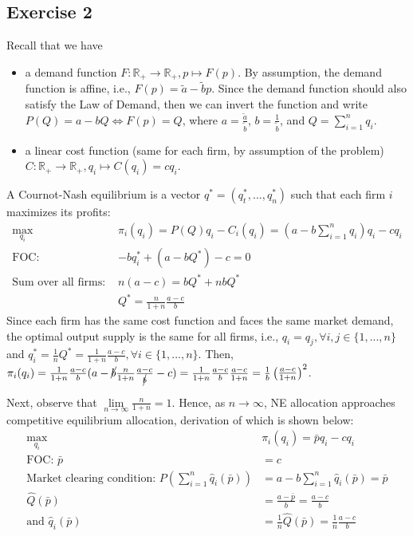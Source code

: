 \documentclass[]{article}
\begin{document}
\subsection*{Exercise 2}

Recall that we have 
\begin{itemize}
	\item a demand function $F: \mathbb{R}_{+}\to\mathbb{R}_{+}, p\mapsto F(p)$. By assumption, the demand function is affine, i.e., $F(p) = \tilde{a} - \tilde{b}p$. Since the demand function should also satisfy the Law of Demand, then we can invert the function and write $P(Q) = a - bQ \Leftrightarrow F(p) = Q$, where $a = \frac{\tilde{a}}{\tilde{b}}$, $b = \frac{1}{\tilde{b}}$, and $Q = \sum\limits_{i = 1}^nq_i$.
	\item a linear cost function (same for each firm, by assumption of the problem) $C:\mathbb{R}_{+}\to\mathbb{R}_{+}, q_i\mapsto C(q_i) = cq_i$. 
\end{itemize}

A Cournot-Nash equilibrium is a vector $q^* = (q_t^*, ..., q_n^*)$ such that each firm $i$ maximizes its profits:
\begin{equation}
	\begin{split}
		\max\limits_{q_i}\quad&\pi_i(q_i) = P(Q)q_i - C_i(q_i) = (a - b\sum\limits_{i = 1}^n q_i)q_i -  cq_i \\\nonumber
		\text{FOC: }&-bq_i^* + (a - bQ^*) - c = 0\\
		\text{Sum over all firms: }&n(a - c) = bQ^* + nbQ^* \\
		&Q^* = \frac{n}{1 + n}\frac{a - c}{b}
	\end{split}
\end{equation}
Since each firm has the same cost function and faces the same market demand, the optimal output supply is the same for all firms, i.e., $q_i = q_j, \forall i, j\in \{1, ..., n\}$ and $q_i^* = \frac{1}{n}Q^* = \frac{1}{1 + n}\frac{a - c}{b}, \forall i\in\{1, ..., n\}$. Then, $\pi_i(q_i) = \frac{1}{1 + n}\frac{a - c}{b}(a - \cancel{b}\frac{n}{1 + n}\frac{a - c}{\cancel{b}} - c) = \frac{1}{1 + n}\frac{a - c}{b}\frac{a - c}{1 + n} = \frac{1}{b}\begin{pmatrix}\frac{a - c}{1 + n}\end{pmatrix}^2$.

Next, observe that $\lim\limits_{n\to\infty} \frac{n}{1 + n} = 1$. Hence, as $n\to\infty$, NE allocation approaches competitive equilibrium allocation, derivation of which is shown below:
\begin{equation}
\begin{split}
\max\limits_{q_i}\quad&\pi_i(q_i) = \bar{p}q_i -  cq_i \\\nonumber
\text{FOC: }\bar{p}& = c\\
\text{Market clearing condition: }P(\sum\limits_{i = 1}^n\hat{q}_i(\bar{p}))& = a - b\sum\limits_{i = 1}^n\hat{q}_i(\bar{p}) = \bar{p} \\
\hat{Q}(\bar{p})& = \frac{a - \bar{p}}{b} = \frac{a - c}{b}\\
\text{and }\hat{q}_i(\bar{p})& = \frac{1}{n}\hat{Q}(\bar{p}) = \frac{1}{n}\frac{a - c}{b}
\end{split}
\end{equation}
\end{document}
